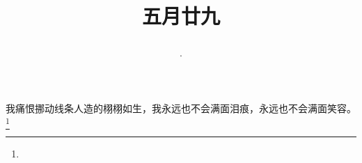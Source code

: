 \title{\date[d=4,m=7,y=2024][year:cn-y,年,month:cn,day:cn,日,·,weekday]·五月廿九 }
我痛恨挪动线条人造的栩栩如生，我永远也不会满面泪痕，永远也不会满面笑容。\footnote{ }

